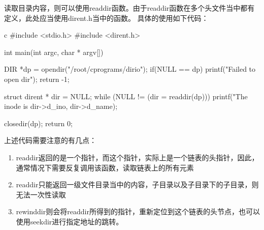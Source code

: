 读取目录内容，则可以使用readdir函数。由于readdir函数在多个头文件当中都有定义，此处应当使用dirent.h当中的函数。
具体的使用如下代码：
\begin{code-block}{c}
#include <stdio.h>
#include <dirent.h>

int main(int argc, char * argv[])
{
        DIR *dp = opendir("/root/cprograms/dirio");
        if(NULL ==  dp)
        {
                printf("Failed to open dir\n");
                return -1;
        }

        struct dirent * dir = NULL;
        while (NULL != (dir = readdir(dp)))
        {
                printf("The inode is %
                        dir->d_ino, dir->d_name);
        }

        closedir(dp);
        return 0;
}
\end{code-block}
上述代码需要注意的有几点：
\begin{enumerate}
  \item readdir返回的是一个指针，而这个指针，实际上是一个链表的头指针，因此，通常情况下需要反复调用该函数，读取链表上的所有元素
  \item readdir只能返回一级文件目录当中的内容，子目录以及子目录下的子目录，则无法一次性读取
  \item rewinddir则会将readdir所得到的指针，重新定位到这个链表的头节点，也可以使用seekdir进行指定地址的跳转。
\end{enumerate}

